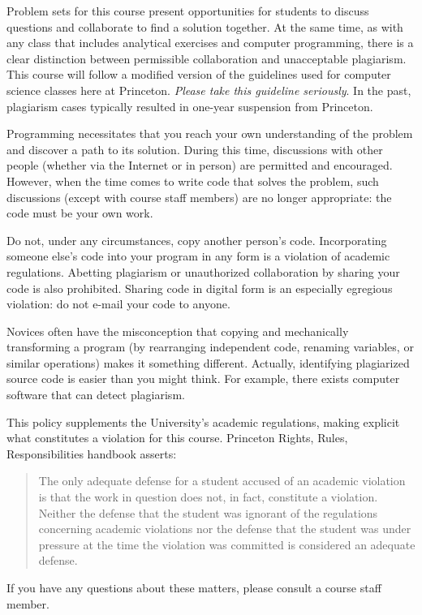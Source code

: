 \documentclass[11pt]{article}
\begin{document}
Problem sets for this course present opportunities for students to
discuss questions and collaborate to find a solution together. At the
same time, as with any class that includes analytical exercises and
computer programming, there is a clear distinction between permissible
collaboration and unacceptable plagiarism.  This course will follow a
modified version of the guidelines used for computer science classes
here at Princeton. {\it Please take this guideline seriously}.  In
the past, plagiarism cases typically resulted in one-year suspension
from Princeton.

Programming necessitates that you reach your own understanding of the
problem and discover a path to its solution. During this time,
discussions with other people (whether via the Internet or in person)
are permitted and encouraged. However, when the time comes to write
code that solves the problem, such discussions (except with course
staff members) are no longer appropriate: the code must be your own
work.  

{\sc Do not, under any circumstances, copy another person's
  code}. Incorporating someone else's code into your program in any
form is a violation of academic regulations. Abetting plagiarism or
unauthorized collaboration by sharing your code is also
prohibited. Sharing code in digital form is an especially egregious
violation: do not e-mail your code to anyone.

Novices often have the misconception that copying and mechanically
transforming a program (by rearranging independent code, renaming
variables, or similar operations) makes it something different.
Actually, identifying plagiarized source code is easier than you might
think.  For example, there exists computer software that can detect
plagiarism.

This policy supplements the University's academic regulations, making
explicit what constitutes a violation for this course. Princeton
Rights, Rules, Responsibilities handbook asserts:
\begin{quote}
  The only adequate defense for a student accused of an academic
  violation is that the work in question does not, in fact, constitute
  a violation. Neither the defense that the student was ignorant of
  the regulations concerning academic violations nor the defense that
  the student was under pressure at the time the violation was
  committed is considered an adequate defense.
\end{quote}
If you have any questions about these matters, please consult a course
staff member.
\end{document}
